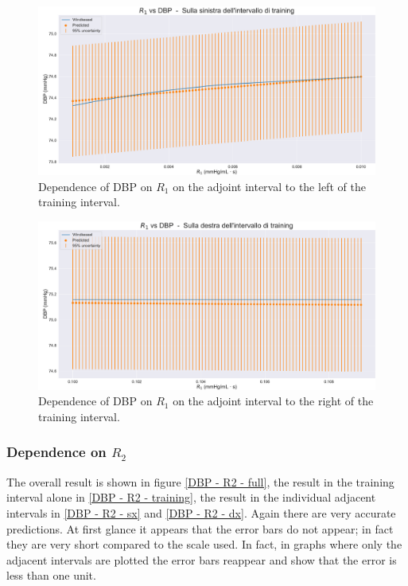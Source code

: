 \begin{figure}
    \centering
    \includegraphics[width=1\textwidth]{images/Training (risultati)/DBP/DBP - R1 - sx.pdf}
    \caption{Dependence of DBP on $R_1$ on the adjoint interval to the left of the training interval.}
    \label{DBP - R1 - sx}
\end{figure}



\begin{figure}
    \centering
    \includegraphics[width=1\textwidth]{images/Training (risultati)/DBP/DBP - R1 - dx.pdf}
    \caption{Dependence of DBP on $R_1$ on the adjoint interval to the right of the training interval.}
    \label{DBP - R1 - dx}
\end{figure}



\newpage
\subsubsection{Dependence on $R_2$}
The overall result is shown in figure \ref{DBP - R2 - full}, the result in the training interval alone in \ref{DBP - R2 - training}, the result in the individual adjacent intervals in \ref{DBP - R2 - sx} and \ref{DBP - R2 - dx}. Again there are very accurate predictions. At first glance it appears that the error bars do not appear; in fact they are very short compared to the scale used. In fact, in graphs where only the adjacent intervals are plotted the error bars reappear and show that the error is less than one unit.

